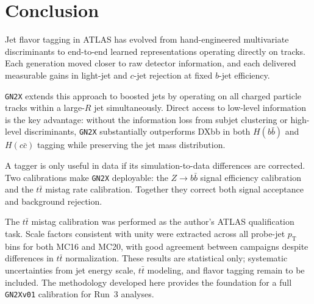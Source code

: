 \section{Conclusion}

Jet flavor tagging in ATLAS has evolved from hand-engineered multivariate discriminants to end-to-end learned representations operating directly on tracks.
Each generation moved closer to raw detector information, and each delivered measurable gains in light-jet and $c$-jet rejection at fixed $b$-jet efficiency.

\texttt{GN2X} extends this approach to boosted jets by operating on all charged particle tracks within a large-$R$ jet simultaneously.
Direct access to low-level information is the key advantage: without the information loss from subjet clustering or high-level discriminants, \texttt{GN2X} substantially outperforms DXbb in both $H(b\bar{b})$ and $H(c\bar{c})$ tagging while preserving the jet mass distribution.

A tagger is only useful in data if its simulation-to-data differences are corrected.
Two calibrations make \texttt{GN2X} deployable: the $Z \rightarrow b\bar{b}$ signal efficiency calibration and the $t\bar{t}$ mistag rate calibration.
Together they correct both signal acceptance and background rejection.

The $t\bar{t}$ mistag calibration was performed as the author's ATLAS qualification task.
Scale factors consistent with unity were extracted across all probe-jet $p_\text{T}$ bins for both MC16 and MC20, with good agreement between campaigns despite differences in $t\bar{t}$ normalization.
These results are statistical only; systematic uncertainties from jet energy scale, $t\bar{t}$ modeling, and flavor tagging remain to be included.
The methodology developed here provides the foundation for a full \texttt{GN2Xv01} calibration for Run~3 analyses.




